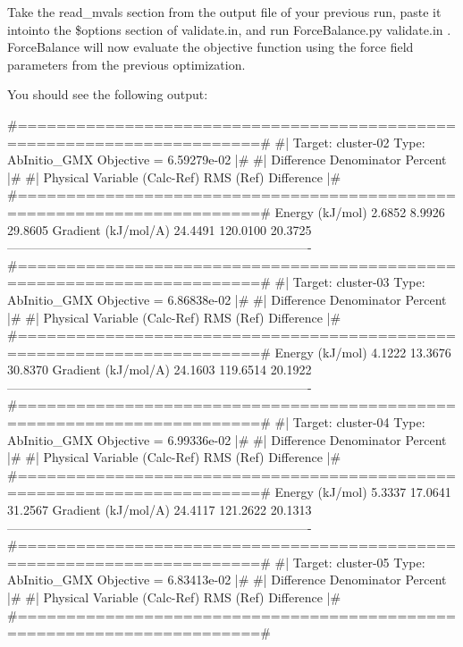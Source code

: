 \-Take the {\ttfamily read\-\_\-mvals} section from the output file of your previous run, paste it intointo the {\ttfamily \$options} section of {\ttfamily validate.\-in}, and run {\ttfamily \-Force\-Balance.\-py validate.\-in} . \-Force\-Balance will now evaluate the objective function using the force field parameters from the previous optimization.

\-You should see the following output\-:

\begin{DoxyVerb}
#=======================================================================#
#|  Target: cluster-02 Type: AbInitio_GMX Objective = 6.59279e-02      |#
#|                              Difference   Denominator     Percent   |#
#|  Physical Variable           (Calc-Ref)     RMS (Ref)   Difference  |#
#=======================================================================#
    Energy (kJ/mol)                 2.6852        8.9926     29.8605%
    Gradient (kJ/mol/A)            24.4491      120.0100     20.3725%
-------------------------------------------------------------------------
#=======================================================================#
#|  Target: cluster-03 Type: AbInitio_GMX Objective = 6.86838e-02      |#
#|                              Difference   Denominator     Percent   |#
#|  Physical Variable           (Calc-Ref)     RMS (Ref)   Difference  |#
#=======================================================================#
    Energy (kJ/mol)                 4.1222       13.3676     30.8370%
    Gradient (kJ/mol/A)            24.1603      119.6514     20.1922%
-------------------------------------------------------------------------
#=======================================================================#
#|  Target: cluster-04 Type: AbInitio_GMX Objective = 6.99336e-02      |#
#|                              Difference   Denominator     Percent   |#
#|  Physical Variable           (Calc-Ref)     RMS (Ref)   Difference  |#
#=======================================================================#
    Energy (kJ/mol)                 5.3337       17.0641     31.2567%
    Gradient (kJ/mol/A)            24.4117      121.2622     20.1313%
-------------------------------------------------------------------------
#=======================================================================#
#|  Target: cluster-05 Type: AbInitio_GMX Objective = 6.83413e-02      |#
#|                              Difference   Denominator     Percent   |#
#|  Physical Variable           (Calc-Ref)     RMS (Ref)   Difference  |#
#=======================================================================#

\end{DoxyVerb}
